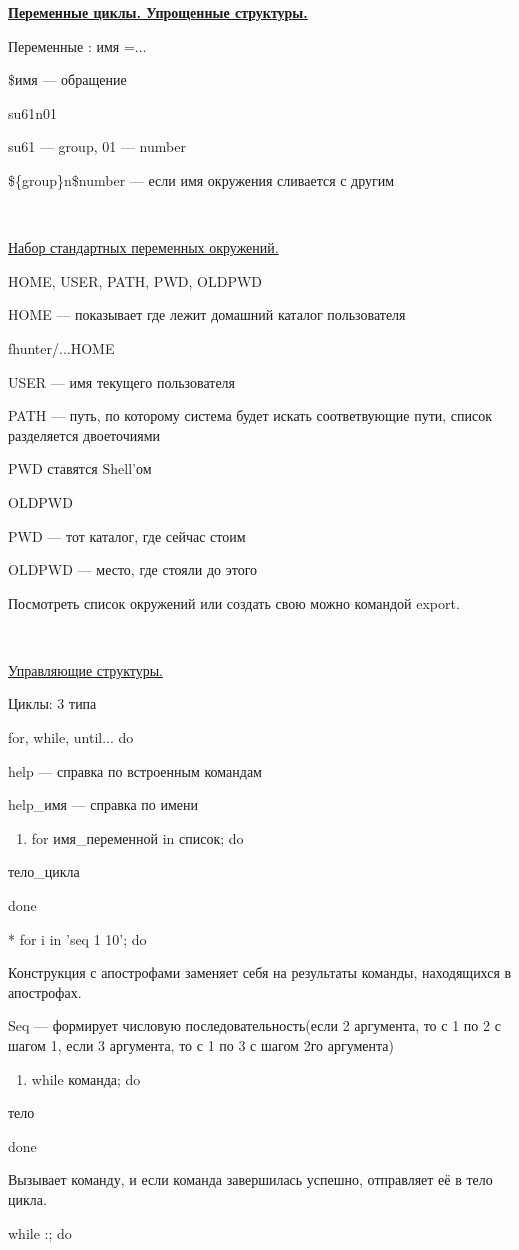 \par \underline{\textbf{Переменные
циклы. Упрощенные структуры.}}
\par 
Переменные : имя =...
\par 
\$имя — обращение
\par 
su61n01
\par 
su61 — group, 01 — number
\par 
\$\{group\}n\$number — если имя окружения сливается
с другим
\par 
\\

\par 
\underline{Набор стандартных переменных окружений.}
\par 
HOME, USER, PATH, PWD, OLDPWD
\par 
HOME — показывает где лежит домашний
каталог пользователя
\par 
fhunter/...HOME
\par 
USER — имя текущего пользователя
\par 
PATH — путь, по которому система будет
искать соответвующие пути, список
разделяется двоеточиями
\par PWD
            ставятся Shell'ом
\par 
OLDPWD
\par 
PWD — тот каталог, где сейчас стоим
\par 
OLDPWD — место, где стояли до этого
\par 
Посмотреть список окружений или создать
свою можно командой export.
\par 
\\

\par 
\underline{Управляющие структуры.}
\par 
Циклы: 3 типа
\par 
for, while, until... do
\par 
help — справка по встроенным командам
\par 
help\_имя — справка по имени
\begin{enumerate}
	\item \par 
	for имя\_переменной in список; do
\end{enumerate}
\par 
тело\_цикла
\par 
done
\par 
* for i in 'seq 1 10'; do
\par 
Конструкция с апострофами заменяет
себя на результаты команды, находящихся
в апострофах.
\par 
Seq — формирует числовую последовательность(если
2 аргумента, то с 1 по 2 с шагом 1, если 3
аргумента, то с 1 по 3 с шагом 2го аргумента)
\begin{enumerate}
	\item \par 
	while команда; do
\end{enumerate}
\par 
тело
\par 
done
\par 
Вызывает команду, и если команда
завершилась успешно, отправляет её в
тело цикла.
\par 
while :; do 

